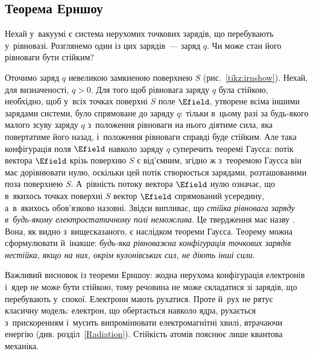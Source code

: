 \subsection*{Теорема Ерншоу}



Нехай у~вакуумі є система нерухомих точкових зарядів, що перебувають у~рівновазі.
Розглянемо один із цих зарядів~--- заряд $q$. Чи може стан його рівноваги бути стійким?

\begin{wrapstuff}[type=figure, width=0.3\linewidth, o, top=2]
	\centering
	\caption{До теореми Ерншоу}%
	\label{tikz:irnshow}
\end{wrapstuff}
Оточимо заряд $q$ невеликою замкненою поверхнею $S$ (рис.~\ref{tikz:irnshow}). Нехай, для
визначеності, $q > 0$. Для того щоб рівновага заряду $q$ була стійкою, необхідно, щоб
у~всіх точках поверхні $S$ поле $\Efield$, утворене всіма іншими зарядами системи, було
спрямоване до заряду $q$: тільки в~цьому разі за будь-якого малого зсуву заряду $q$
з~положення рівноваги на нього діятиме сила, яка повертатиме його назад, і~положення
рівноваги справді буде стійким. Але така конфігурація поля $\Efield$ навколо заряду $q$
суперечить теоремі Гаусса: потік вектора $\Efield$ крізь поверхню $S$ є від'ємним, згідно
ж з~теоремою Гаусса він має дорівнювати нулю, оскільки цей потік створюється зарядами,
розташованими поза поверхнею $S$. А~рівність потоку вектора $\Efield$ нулю означає, що
в~якихось точках поверхні $S$ вектор $\Efield$ спрямований усередину, а~в~якихось
обов'язково назовні. Звідси випливає, що \emph{стійка рівновага заряду в~будь-якому
	електростатичному полі неможлива}. Це твердження має назву . Вона,
як видно з~вищесказаного, є наслідком теореми Гаусса. Теорему можна сформулювати
й~інакше: \emph{будь-яка рівноважна конфігурація точкових зарядів нестійка, якщо на них,
	окрім кулонівських сил, не діють інші сили}.

Важливий висновок із теореми Ерншоу: жодна нерухома конфігурація електронів і~ядер не може
бути стійкою, тому речовина не може складатися зі зарядів, що перебувають у~спокої.
Електрони мають рухатися. Проте й~рух не рятує класичну модель: електрон, що обертається
навколо ядра, рухається з~прискоренням і~мусить випромінювати електромагнітні хвилі,
втрачаючи енергію (див. розділ~\ref{Radiation}). Стійкість атомів пояснює лише квантова
механіка.




